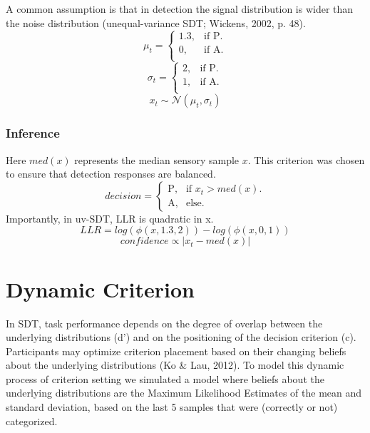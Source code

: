 \documentclass[12pt,twoside]{reedthesis}
\begin{document}
A common assumption is that in detection the signal distribution is wider than the noise distribution (unequal-variance SDT; Wickens, 2002, p. 48).
\begin{equation}
  \mu_t=\begin{cases}
    1.3, & \text{if P}.\\
    0, & \text{if A}.\\
  \end{cases}
\end{equation}
\begin{equation}
  \sigma_t=\begin{cases}
    2, & \text{if P}.\\
    1, & \text{if A}.\\
  \end{cases}
\end{equation}
\begin{equation}
   x_t \sim \mathcal{N}(\mu_t,\sigma_t)    
\end{equation}
\hypertarget{inference-3}{%
\subsubsection*{Inference}\label{inference-3}}

Here \(med(x)\) represents the median sensory sample \(x\). This criterion was chosen to ensure that detection responses are balanced.
\begin{equation}
  decision=\begin{cases}
    \text{P}, & \text{if } x_t>med(x).\\
    \text{A}, & \text{else}.
  \end{cases}
\end{equation}
Importantly, in uv-SDT, LLR is quadratic in x.
\begin{equation}
LLR = log(\phi(x,1.3,2))-log(\phi(x,0,1))
\end{equation}
\begin{equation}
confidence \propto |x_t-med(x)|
\end{equation}
\hypertarget{app3:Dynamic}{%
\section{Dynamic Criterion}\label{app3:Dynamic}}

In SDT, task performance depends on the degree of overlap between the underlying distributions (d') and on the positioning of the decision criterion (c). Participants may optimize criterion placement based on their changing beliefs about the underlying distributions (Ko \& Lau, 2012). To model this dynamic process of criterion setting we simulated a model where beliefs about the underlying distributions are the Maximum Likelihood Estimates of the mean and standard deviation, based on the last 5 samples that were (correctly or not) categorized.
\end{document}
